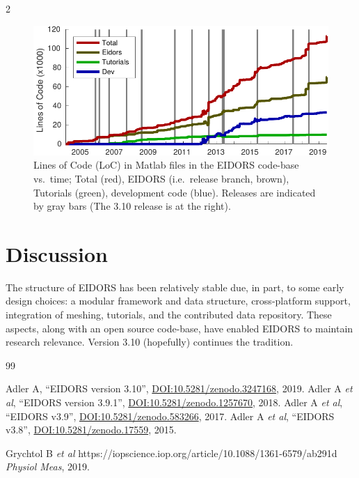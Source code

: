 \documentclass[10pt,letterpaper]{article}
\renewenvironment{thebibliography}[1]{%
    \begin{oldthebibliography}{#1}%
      \setlength{\parskip}{0ex}%
      \setlength{\itemsep}{0ex}%
  }%
  {%
    \end{oldthebibliography}%
  }
\begin{document}
\begin{multicols}{2}
\begin{figure}[H]
  \vspace{-2.5mm}
\centering
 \includegraphics[width=.99\columnwidth]{fig_loc.pdf}
\caption{\label{fig:loc}%
  Lines of Code (LoC) in Matlab files in the EIDORS code-base vs.\ time; Total
   (red), EIDORS (i.e.\ release branch, brown), Tutorials (green), development code (blue).
   Releases are indicated by gray bars (The 3.10 release is
   at the right).
}
\end{figure}

\section{Discussion}
The structure of EIDORS has been relatively stable due, in part, to some early design choices:
a modular framework and data structure,
cross-platform support, integration of meshing,
tutorials, and the contributed data repository.
These aspects, along with an open source code-base, have enabled EIDORS to
maintain research relevance.
Version 3.10 (hopefully) continues the tradition.



\footnotesize
\begin{thebibliography}{99}
   Adler A, ``EIDORS version 3.10'',
   \href{http://dx.doi.org/10.5281/zenodo.3247168}{DOI:10.5281/zenodo.3247168},
    2019.
   Adler A {\em et al}, ``EIDORS version 3.9.1'',
   \href{http://dx.doi.org/10.5281/zenodo.1257670}{DOI:10.5281/zenodo.1257670},
    2018.
   Adler A {\em et al}, ``EIDORS v3.9'',
   \href{http://dx.doi.org/10.5281/zenodo.583266}{DOI:10.5281/zenodo.583266},
    2017.
   Adler A {\em et al}, ``EIDORS v3.8'',
   \href{http://dx.doi.org/10.5281/zenodo.17559}{DOI:10.5281/zenodo.17559},
    2015.

   Grychtol B {\em et al}
   https://iopscience.iop.org/article/10.1088/1361-6579/ab291d   
   {\em Physiol Meas}, 2019.




\end{thebibliography}
\end{multicols}
\end{document}
